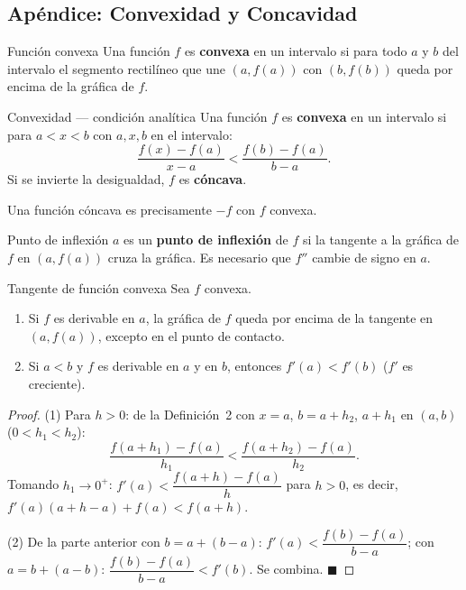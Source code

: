 \documentclass[12pt]{article}
\begin{document}
\subsection{Apéndice: Convexidad y Concavidad}

\begin{definicion}[1]{Función convexa}
Una función $f$ es \textbf{convexa} en un intervalo si para todo $a$ y $b$ del intervalo el segmento rectilíneo que une $(a, f(a))$ con $(b, f(b))$ queda por encima de la gráfica de $f$.
\end{definicion}

\begin{definicion}[2]{Convexidad — condición analítica}
Una función $f$ es \textbf{convexa} en un intervalo si para $a < x < b$ con $a, x, b$ en el intervalo:
\[ \frac{f(x) - f(a)}{x - a} < \frac{f(b) - f(a)}{b - a}. \]
Si se invierte la desigualdad, $f$ es \textbf{cóncava}.
\end{definicion}

\begin{nota}[]{}
Una función cóncava es precisamente $-f$ con $f$ convexa.
\end{nota}

\begin{definicion}[]{Punto de inflexión}
$a$ es un \textbf{punto de inflexión} de $f$ si la tangente a la gráfica de $f$ en $(a, f(a))$ cruza la gráfica. Es necesario que $f''$ cambie de signo en $a$.
\end{definicion}

\begin{teorema}[1]{Tangente de función convexa}
Sea $f$ convexa.
\begin{enumerate}
  \item[(1)] Si $f$ es derivable en $a$, la gráfica de $f$ queda por encima de la tangente en $(a, f(a))$, excepto en el punto de contacto.
  \item[(2)] Si $a < b$ y $f$ es derivable en $a$ y en $b$, entonces $f'(a) < f'(b)$ ($f'$ es creciente).
\end{enumerate}
\end{teorema}

\begin{proof}
(1) Para $h > 0$: de la Definición~2 con $x = a$, $b = a+h_2$, $a+h_1$ en $(a,b)$ ($0 < h_1 < h_2$):
\[ \frac{f(a+h_1)-f(a)}{h_1} < \frac{f(a+h_2)-f(a)}{h_2}. \]
Tomando $h_1 \to 0^+$: $f'(a) < \dfrac{f(a+h)-f(a)}{h}$ para $h > 0$, es decir, $f'(a)(a+h-a)+f(a) < f(a+h)$.

(2) De la parte anterior con $b = a + (b-a)$: $f'(a) < \dfrac{f(b)-f(a)}{b-a}$; con $a = b + (a-b)$: $\dfrac{f(b)-f(a)}{b-a} < f'(b)$. Se combina.
$\blacksquare$
\end{proof}
\end{document}
